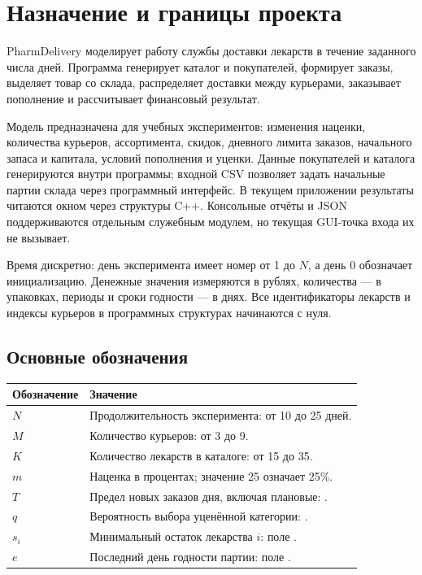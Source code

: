 \section{Назначение и границы проекта}
\label{sec:overview}

PharmDelivery моделирует работу службы доставки лекарств в течение заданного
числа дней. Программа генерирует каталог и покупателей, формирует заказы,
выделяет товар со склада, распределяет доставки между курьерами, заказывает
пополнение и рассчитывает финансовый результат.

Модель предназначена для учебных экспериментов: изменения наценки, количества
курьеров, ассортимента, скидок, дневного лимита заказов, начального запаса
и капитала, условий пополнения и уценки. Данные покупателей и каталога
генерируются внутри программы; входной CSV позволяет задать начальные партии
склада через программный интерфейс. В текущем приложении результаты читаются
окном через структуры C++. Консольные отчёты и JSON поддерживаются отдельным
служебным модулем, но текущая GUI-точка входа их не вызывает.

Время дискретно: день эксперимента имеет номер от 1 до $N$, а день 0 обозначает
инициализацию. Денежные значения измеряются в рублях, количества --- в упаковках,
периоды и сроки годности --- в днях. Все идентификаторы лекарств и индексы
курьеров в программных структурах начинаются с нуля.

\subsection{Основные обозначения}
\begin{tabularx}{\textwidth}{@{}L{0.18\textwidth}Y@{}}
\toprule
Обозначение & Значение \\
\midrule
$N$ & Продолжительность эксперимента: от 10 до 25 дней. \\
$M$ & Количество курьеров: от 3 до 9. \\
$K$ & Количество лекарств в каталоге: от 15 до 35. \\
$m$ & Наценка в процентах; значение 25 означает 25\%. \\
$T$ & Предел новых заказов дня, включая плановые: . \\
$q$ & Вероятность выбора уценённой категории: . \\
$s_i$ & Минимальный остаток лекарства $i$: поле . \\
$e$ & Последний день годности партии: поле . \\
\bottomrule
\end{tabularx}

